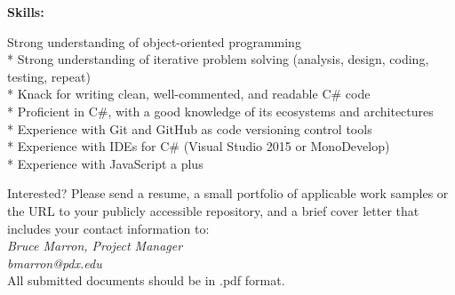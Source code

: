 \documentclass[letterpaper, 12pt]{article}
\newenvironment{myindentpar}[1]%
   {\begin{list}{}%
       {\setlength{\leftmargin}{#1}}%
           \item[]%
   }
     {\end{list}}
\begin{document}
\newpage

\textbf{Skills:}
\begin{myindentpar}{1em}
* Strong understanding of object-oriented programming \\
* Strong understanding of iterative problem solving (analysis, design, coding, testing, repeat) \\
* Knack for writing clean, well-commented, and readable C\# code \\
* Proficient in C\#, with a good knowledge of its ecosystems and architectures \\
* Experience with Git and GitHub as code versioning control tools \\
* Experience with IDEs for C\# (Visual Studio 2015 or MonoDevelop) \\
* Experience with JavaScript a plus \\
\end{myindentpar}
	
Interested? Please send a resume, a small portfolio of applicable work samples or the URL to your publicly accessible repository, and a brief cover letter that includes your contact information to:\\

\textit{Bruce Marron, Project Manager\\
bmarron@pdx.edu} \\

All submitted documents should be in .pdf format.







%
%
\end{document}
